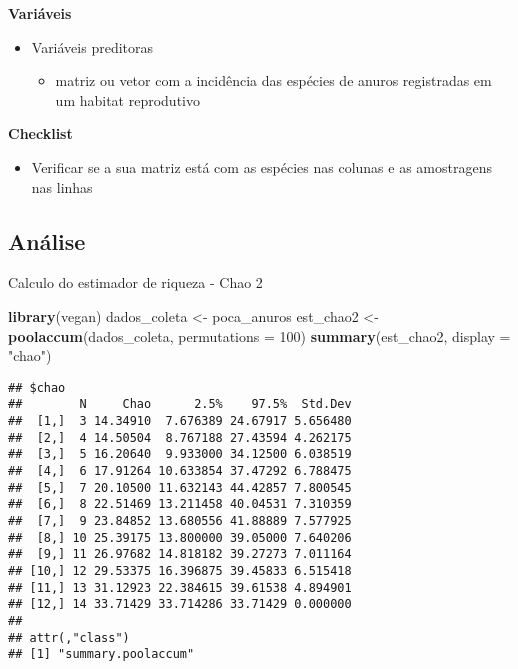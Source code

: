 \documentclass[
]{book}
\newenvironment{Shaded}{\begin{snugshade}}{\end{snugshade}}
\newcommand{\DataTypeTok}[1]{\textcolor[rgb]{0.13,0.29,0.53}{#1}}
\newcommand{\DecValTok}[1]{\textcolor[rgb]{0.00,0.00,0.81}{#1}}
\newcommand{\KeywordTok}[1]{\textcolor[rgb]{0.13,0.29,0.53}{\textbf{#1}}}
\newcommand{\NormalTok}[1]{#1}
\newcommand{\StringTok}[1]{\textcolor[rgb]{0.31,0.60,0.02}{#1}}
\providecommand{\tightlist}{%
  \setlength{\itemsep}{0pt}\setlength{\parskip}{0pt}}
\begin{document}
\textbf{Variáveis}

\begin{itemize}
\tightlist
\item
  Variáveis preditoras

  \begin{itemize}
  \tightlist
  \item
    matriz ou vetor com a incidência das espécies de anuros registradas em um habitat reprodutivo
  \end{itemize}
\end{itemize}

\textbf{Checklist}

\begin{itemize}
\tightlist
\item
  Verificar se a sua matriz está com as espécies nas colunas e as amostragens nas linhas
\end{itemize}

\hypertarget{anuxe1lise-2}{%
\subsection{Análise}\label{anuxe1lise-2}}

Calculo do estimador de riqueza - Chao 2

\begin{Shaded}
\begin{Highlighting}[]
\KeywordTok{library}\NormalTok{(vegan)}
\NormalTok{dados_coleta <-}\StringTok{ }\NormalTok{poca_anuros}
\NormalTok{est_chao2 <-}\StringTok{ }\KeywordTok{poolaccum}\NormalTok{(dados_coleta, }\DataTypeTok{permutations =} \DecValTok{100}\NormalTok{)}
\KeywordTok{summary}\NormalTok{(est_chao2, }\DataTypeTok{display =} \StringTok{"chao"}\NormalTok{)}
\end{Highlighting}
\end{Shaded}

\begin{verbatim}
## $chao
##        N     Chao      2.5%    97.5%  Std.Dev
##  [1,]  3 14.34910  7.676389 24.67917 5.656480
##  [2,]  4 14.50504  8.767188 27.43594 4.262175
##  [3,]  5 16.20640  9.933000 34.12500 6.038519
##  [4,]  6 17.91264 10.633854 37.47292 6.788475
##  [5,]  7 20.10500 11.632143 44.42857 7.800545
##  [6,]  8 22.51469 13.211458 40.04531 7.310359
##  [7,]  9 23.84852 13.680556 41.88889 7.577925
##  [8,] 10 25.39175 13.800000 39.05000 7.640206
##  [9,] 11 26.97682 14.818182 39.27273 7.011164
## [10,] 12 29.53375 16.396875 39.45833 6.515418
## [11,] 13 31.12923 22.384615 39.61538 4.894901
## [12,] 14 33.71429 33.714286 33.71429 0.000000
## 
## attr(,"class")
## [1] "summary.poolaccum"
\end{verbatim}
\end{document}
